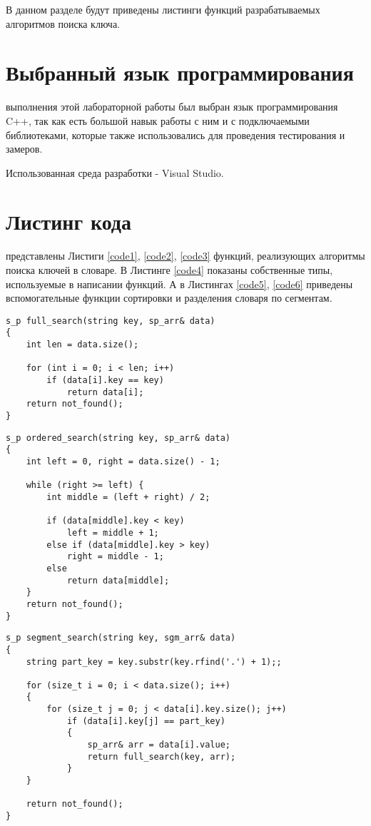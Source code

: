 В данном разделе будут приведены листинги функций разрабатываемых алгоритмов поиска ключа.

\section{Выбранный язык программирования}
 выполнения этой лабораторной работы был выбран язык программирования C++, так как есть большой навык работы с ним и с подключаемыми библиотеками, которые также использовались для проведения тестирования и замеров. \cite{c_plus_plus}

Использованная среда разработки - Visual Studio. \cite{Visual}

\section{Листинг кода}
 представлены Листиги \ref{code1}, \ref{code2}, \ref{code3} функций, реализующих алгоритмы поиска ключей в словаре. В Листинге \ref{code4} показаны собственные типы, используемые в написании функций. А в Листингах \ref{code5}, \ref{code6} приведены вспомогательные функции сортировки и разделения словаря по сегментам.

\begin{lstlisting}[label=code1, caption = Поиск полным перебором]
s_p full_search(string key, sp_arr& data)
{
	int len = data.size();
	
	for (int i = 0; i < len; i++)
		if (data[i].key == key)
			return data[i];
	return not_found();
}
\end{lstlisting}

\begin{lstlisting}[label=code2, caption = Поиск в упорядоченном словаре двоичным поиском]
s_p ordered_search(string key, sp_arr& data)
{
	int left = 0, right = data.size() - 1;
	
	while (right >= left) {
		int middle = (left + right) / 2;   
		
		if (data[middle].key < key)
			left = middle + 1;
		else if (data[middle].key > key)
			right = middle - 1;
		else
			return data[middle];
	}
	return not_found();
}
\end{lstlisting}

\begin{lstlisting}[label=code3, caption = Поиск полным перебором с использованием сегментов]
s_p segment_search(string key, sgm_arr& data)
{
	string part_key = key.substr(key.rfind('.') + 1);;
	
	for (size_t i = 0; i < data.size(); i++)
	{
		for (size_t j = 0; j < data[i].key.size(); j++)
			if (data[i].key[j] == part_key)
			{
				sp_arr& arr = data[i].value;
				return full_search(key, arr);
			}
	}
	
	return not_found();
}
\end{lstlisting}

